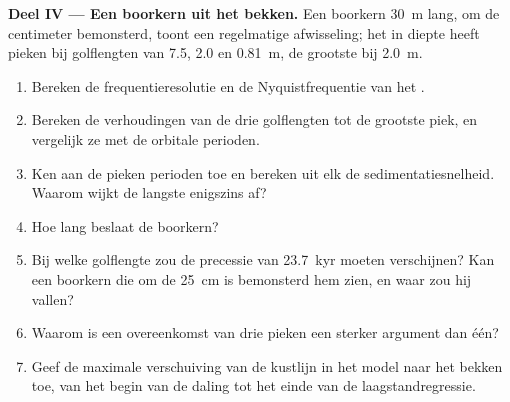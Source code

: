 \begin{problem}
\medskip\noindent\textbf{Deel IV --- Een boorkern uit het bekken.} Een boorkern
\qty{30}{m} lang, om de centimeter bemonsterd, toont een regelmatige
afwisseling; het  in diepte heeft pieken bij golflengten van 7.5,
2.0 en \qty{0.81}{m}, de grootste bij \qty{2.0}{m}.
\begin{enumerate}[resume]
\item Bereken de frequentieresolutie en de Nyquistfrequentie van het
  .
\item Bereken de verhoudingen van de drie golflengten tot de grootste piek, en
  vergelijk ze met de orbitale perioden.
\item Ken aan de pieken perioden toe en bereken uit elk de sedimentatiesnelheid.
  Waarom wijkt de langste enigszins af?
\item Hoe lang beslaat de boorkern?
\item Bij welke golflengte zou de precessie van \qty{23.7}{kyr} moeten verschijnen?
  Kan een boorkern die om de \qty{25}{cm} is bemonsterd hem zien, en waar zou hij vallen?
\item Waarom is een overeenkomst van drie pieken een sterker argument dan één?
\item Geef de maximale verschuiving van de kustlijn in het model naar het bekken toe,
  van het begin van de daling tot het einde van de laagstandregressie.
\end{enumerate}
\end{problem}
